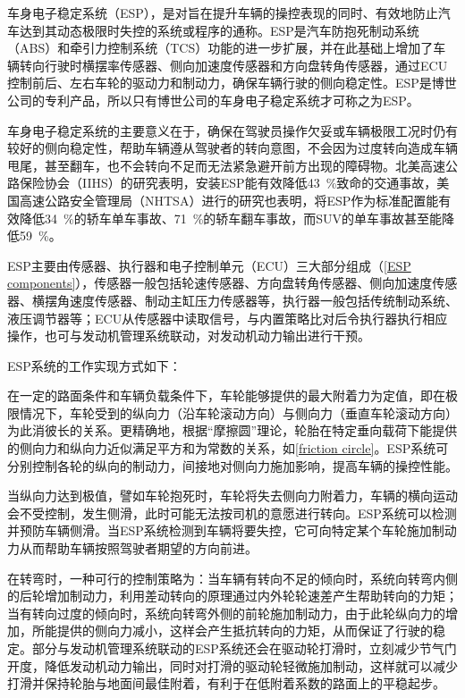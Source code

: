\documentclass[UTF8]{ctexart}
\numberwithin{figure}{section}
\numberwithin{table}{section}
\begin{document}
车身电子稳定系统（ESP），是对旨在提升车辆的操控表现的同时、有效地防止汽车达到其动态极限时失控的系统或程序的通称。ESP是汽车防抱死制动系统（ABS）和牵引力控制系统（TCS）功能的进一步扩展，并在此基础上增加了车辆转向行驶时横摆率传感器、侧向加速度传感器和方向盘转角传感器，通过ECU控制前后、左右车轮的驱动力和制动力，确保车辆行驶的侧向稳定性。ESP是博世公司的专利产品，所以只有博世公司的车身电子稳定系统才可称之为ESP。

车身电子稳定系统的主要意义在于，确保在驾驶员操作欠妥或车辆极限工况时仍有较好的侧向稳定性，帮助车辆遵从驾驶者的转向意图，不会因为过度转向造成车辆甩尾，甚至翻车，也不会转向不足而无法紧急避开前方出现的障碍物。北美高速公路保险协会（IIHS）的研究表明，安装ESP能有效降低\SI{43}{\percent}致命的交通事故，美国高速公路安全管理局（NHTSA）进行的研究也表明，将ESP作为标准配置能有效降低\SI{34}{\percent}的轿车单车事故、\SI{71}{\percent}的轿车翻车事故，而SUV的单车事故甚至能降低\SI{59}{\percent}。

ESP主要由传感器、执行器和电子控制单元（ECU）三大部分组成（\cref{ESP components}），传感器一般包括轮速传感器、方向盘转角传感器、侧向加速度传感器、横摆角速度传感器、制动主缸压力传感器等，执行器一般包括传统制动系统、液压调节器等；ECU从传感器中读取信号，与内置策略比对后令执行器执行相应操作，也可与发动机管理系统联动，对发动机动力输出进行干预。

ESP系统的工作实现方式如下：

在一定的路面条件和车辆负载条件下，车轮能够提供的最大附着力为定值，即在极限情况下，车轮受到的纵向力（沿车轮滚动方向）与侧向力（垂直车轮滚动方向）为此消彼长的关系。更精确地，根据“摩擦圆”理论，轮胎在特定垂向载荷下能提供的侧向力和纵向力近似满足平方和为常数的关系，如\cref{friction circle}。ESP系统可分别控制各轮的纵向的制动力，间接地对侧向力施加影响，提高车辆的操控性能。

当纵向力达到极值，譬如车轮抱死时，车轮将失去侧向力附着力，车辆的横向运动会不受控制，发生侧滑，此时可能无法按司机的意愿进行转向。ESP系统可以检测并预防车辆侧滑。当ESP系统检测到车辆将要失控，它可向特定某个车轮施加制动力从而帮助车辆按照驾驶者期望的方向前进。

在转弯时，一种可行的控制策略为：当车辆有转向不足的倾向时，系统向转弯内侧的后轮增加制动力，利用差动转向的原理通过内外轮轮速差产生帮助转向的力矩；当有转向过度的倾向时，系统向转弯外侧的前轮施加制动力，由于此轮纵向力的增加，所能提供的侧向力减小，这样会产生抵抗转向的力矩，从而保证了行驶的稳定。部分与发动机管理系统联动的ESP系统还会在驱动轮打滑时，立刻减少节气门开度，降低发动机动力输出，同时对打滑的驱动轮轻微施加制动，这样就可以减少打滑并保持轮胎与地面间最佳附着，有利于在低附着系数的路面上的平稳起步。
\end{document}
